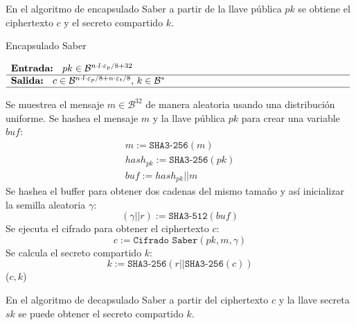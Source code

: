 En el algoritmo de encapsulado Saber a partir de la llave pública \(pk\) se obtiene el ciphertexto \(c\) y el secreto compartido \(k\). 
\begin{algorithm}[H]
	\small 
	\caption{Encapsulado Saber}
	$\begin{array}{p{\textwidth}}
		\textbf{Entrada: } \(pk\in \mathcal{B}^{n\cdot l \cdot \varepsilon_p/8+32}\)\\ 
		\hline
		\textbf{Salida: } \(c\in \mathcal{B}^{n\cdot l\cdot \varepsilon_p/8+n\cdot \varepsilon_t/8}\), \(k\in \mathcal{B}^{*}\)\\ 
		\hline
	\end{array}$
	\begin{algorithmic}[1]
		\State Se muestrea el mensaje \(m\in \mathcal{B}^{32}\) de manera aleatoria usando una distribución uniforme.
		\State Se hashea el mensaje \(m\) y la llave pública \(pk\) para crear una variable \(buf\):
		\begin{equation}
			\begin{array}{l}
				m:=\texttt{SHA3-256}(m)\\
				hash_{pk}:=\texttt{SHA3-256}(pk)\\
				buf:=hash_{pk}||m
			\end{array}
		\end{equation}
		\State Se hashea el buffer para obtener dos cadenas del mismo tamaño y así inicializar la semilla aleatoria $\gamma$:
		\begin{equation}
			(\gamma||r):=\texttt{SHA3-512}(buf)
		\end{equation}
		\State Se ejecuta el cifrado para obtener el ciphertexto \(c\):
		\begin{equation}
			c:=\texttt{Cifrado Saber}(pk,m,\gamma)
		\end{equation}
		\State Se calcula el secreto compartido \(k\):
		\begin{equation}
			k:=\texttt{SHA3-256}(r||\texttt{SHA3-256}(c))
		\end{equation}
		\State \Return (\(c,k\))
	\end{algorithmic}
\end{algorithm}
\newpage
En el algoritmo de decapsulado Saber a partir del ciphertexto \(c\) y la llave secreta \(sk\) se puede obtener el secreto compartido \(k\).
